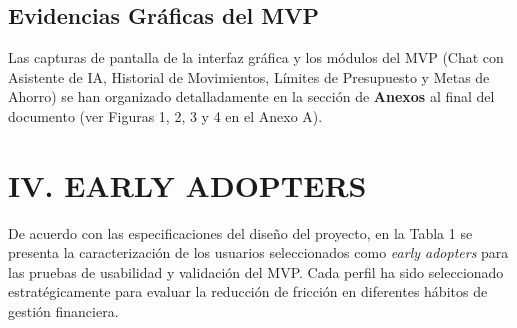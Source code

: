 \documentclass[12pt]{article}
\begin{document}
\newpage

\subsection{Evidencias Gráficas del MVP}
Las capturas de pantalla de la interfaz gráfica y los módulos del MVP (Chat con Asistente de IA, Historial de Movimientos, Límites de Presupuesto y Metas de Ahorro) se han organizado detalladamente en la sección de \textbf{Anexos} al final del documento (ver Figuras 1, 2, 3 y 4 en el Anexo A).

\newpage

\section{IV. EARLY ADOPTERS}

De acuerdo con las especificaciones del diseño del proyecto, en la Tabla 1 se presenta la caracterización de los usuarios seleccionados como \textit{early adopters} para las pruebas de usabilidad y validación del MVP. Cada perfil ha sido seleccionado estratégicamente para evaluar la reducción de fricción en diferentes hábitos de gestión financiera.
\end{document}
